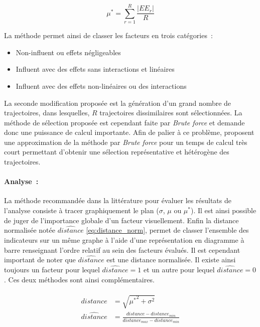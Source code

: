 \begin{equation}\label{eq:moyenne_absolue}
    \mu^{*} = \sum_{r = 1}^{R} \frac{\lvert EE_{r} \rvert}{R}
\end{equation}

\noindent La méthode permet ainsi de classer les facteurs en trois catégories~:
\begin{itemize}
  \item Non-influent ou effets négligeables
  \item Influent avec des effets sans interactions et linéaires
  \item Influent avec des effets non-linéaires ou des interactions
\end{itemize}

La seconde modification proposée est la génération d’un grand nombre de trajectoires,
dans lesquelles, $R$ trajectoires dissimilaires sont sélectionnées. La méthode de sélection
proposée est cependant faite par \emph{Brute force} et demande donc une puissance de
calcul importante.
Afin de palier à ce problème, \textcite{Ruano2012103} proposent une approximation de
la méthode par \emph{Brute force} pour un temps de calcul très court permettant d’obtenir
une sélection représentative et hétérogène des trajectoires.

\paragraph{Analyse~:} %
\label{par:analyse}
La méthode recommandée dans la littérature pour évaluer les résultats de l’analyse
consiste à tracer graphiquement le plan ($\sigma$, $\mu$ ou $\mu^{*}$). Il est
ainsi possible de juger de l’importance globale d’un facteur visuellement.
Enfin la distance normalisée notée $\hat{distance}$ \eqref{eq:distance_norm}, permet
de classer l’ensemble des indicateurs sur un même graphe à l’aide d’une représentation
en diagramme à barre renseignant l’ordre relatif au sein des facteurs évalués.
Il est cependant important de noter que $\hat{distance}$ est une distance
normalisée. Il existe ainsi toujours un facteur pour lequel $\hat{distance} = 1$ et un autre
pour lequel $\hat{distance} = 0$. Ces deux méthodes sont ainsi complémentaires.

\begin{align}\label{eq:distance_norm}
    \begin{split}
        distance        &= \sqrt{{\mu^{*}}^2 + \sigma^{2}} \\
        \hat{distance}  &=  \frac{distance - distance_{min}}{distance_{max} - distance_{min}}
    \end{split}
\end{align}

